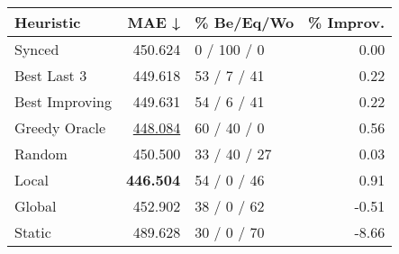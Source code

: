 \begin{tabular}{lrlr}
\toprule
\textbf{Heuristic} & \textbf{MAE ↓} & \textbf{\% Be/Eq/Wo} & \textbf{\% Improv.} \\
\midrule
            Synced &        450.624 &          0 / 100 / 0 &                0.00 \\
\midrule
       Best Last 3 &        449.618 &          53 / 7 / 41 &                0.22 \\
    Best Improving &        449.631 &          54 / 6 / 41 &                0.22 \\
\addlinespace
     Greedy Oracle &        \underline{448.084} &          60 / 40 / 0 &                0.56 \\
            Random &        450.500 &         33 / 40 / 27 &                0.03 \\
\midrule
             Local &        \textbf{446.504} &          54 / 0 / 46 &                0.91 \\
            Global &        452.902 &          38 / 0 / 62 &               -0.51 \\
\midrule
            Static &        489.628 &          30 / 0 / 70 &               -8.66 \\
\bottomrule
\end{tabular}

\label{tab:iid_lr01_le2_bs2_Summary}
